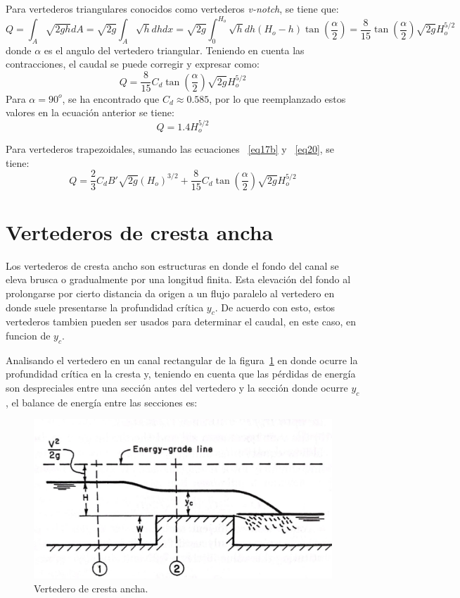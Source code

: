 \documentclass[11pt, oneside]{article}
\begin{document}
Para vertederos triangulares conocidos como vertederos \emph{v-notch}, se tiene que:
\begin{equation}
    Q = \int_A \sqrt{2gh} dA = \sqrt{2g} \int_A \sqrt{h} dh dx = \sqrt{2g} \int_0^{H_o} \sqrt{h} dh \left(H_o-h\right) \tan \left(\frac{\alpha}{2}\right) = \frac{8}{15} \tan\left(\frac{\alpha}{2}\right) \sqrt{2g} H_o^{5/2}
    \label{eq19}
\end{equation}
donde $\alpha$ es el angulo del vertedero triangular. Teniendo en cuenta las contracciones, el caudal se puede corregir y expresar como:
\begin{equation}
    Q =  \frac{8}{15} C_d \tan\left(\frac{\alpha}{2}\right) \sqrt{2g} H_o^{5/2}
    \label{eq20}
\end{equation} 
Para $\alpha = 90^o$, se ha encontrado que $C_d \approx 0.585$, por lo que reemplanzado estos valores en la ecuaci\'on anterior se tiene:
\begin{equation}
    Q =  1.4 H_o^{5/2}
    \label{eq20a}
\end{equation} 

Para vertederos trapezoidales, sumando   las ecuaciones ~\ref{eq17b} y ~\ref{eq20}, se tiene:
\begin{equation}
    Q =  \frac{2}{3}C_d B' \sqrt{2g}\left(H_o \right)^{3/2} + \frac{8}{15} C_d \tan\left(\frac{\alpha}{2}\right) \sqrt{2g} H_o^{5/2}
    \label{eq21}
\end{equation}

\section{Vertederos de cresta ancha}
Los vertederos de cresta ancho son estructuras en donde el fondo del canal se eleva brusca o gradualmente por una longitud finita. Esta elevaci\'on del fondo al prolongarse por cierto distancia da origen a un flujo paralelo al vertedero en donde suele presentarse la profundidad cr\'itica $y_c$. De acuerdo con esto, estos vertederos tambien pueden ser usados para determinar el caudal, en este caso, en funcion de $y_c$.

Analisando el vertedero en un canal rectangular de la figura~\ref{fig78} en donde ocurre la profundidad cr\'itica en la cresta y, teniendo en cuenta que las p\'erdidas de energ\'ia son despreciales entre una secci\'on antes del vertedero y la secci\'on donde ocurre $y_c$, el balance de energ\'ia entre las secciones es:
\begin{figure}[h]
    \centering
    \includegraphics[width=0.8\linewidth]{fig78.jpeg}
    \caption{Vertedero de cresta ancha.}
    \label{fig78}
\end{figure}
\end{document}

